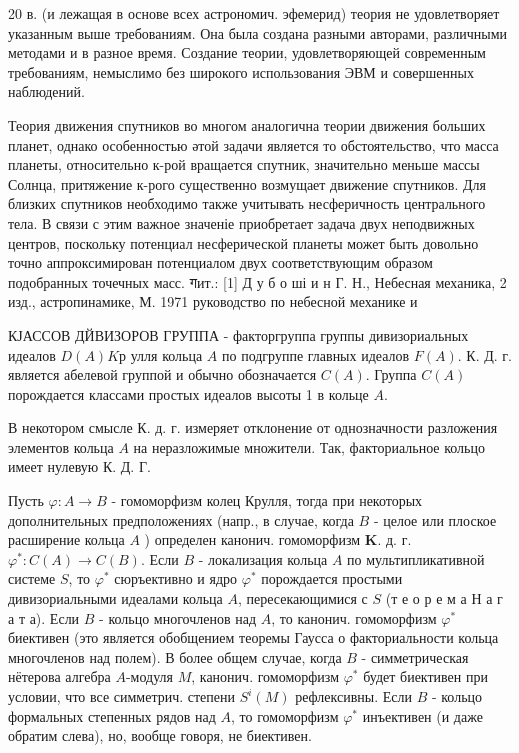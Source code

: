 \documentclass[10pt]{article}
\begin{document}
20 в. (и лежащая в основе всех астрономич. эфемерид) теория не удовлетворяет указанным выше требованиям. Она была создана разными авторами, различными методами и в разное время. Создание теории, удовлетворяющей современным требованиям, немыслимо без широкого использования ЭВМ и совершенных наблюдений.



Теория движения спутников во многом аналогична теории движения больших планет, однако особенностью әтой задачи является то обстоятельство, что масса планеты, относительно к-рой вращается спутник, значительно меньше массы Солнца, притяжение к-рого существенно возмущает движение спутников. Для близких спутников необходимо также учитывать несферичность центрального тела. В связи с этим важное значеніе приобретает задача двух неподвижных центров, поскольку потенциал несферической планеты может быть довольно точно аппроксимирован потенциалом двух соответствующим образом подобранных точечных масс. गит.: [1] Д у б о ші и н Г. Н., Небесная механика, 2 изд., астропинамике, М. 1971 руководство по небесной механике и



КЈАССОВ ДЙВИЗОРОВ ГРУППА - факторгруппа группы дивизориальных идеалов $D(A) K р$ улля кольца $A$ по подгруппе главных идеалов $F(A)$. К. Д. г. является абелевой группой и обычно обозначается $C(A)$. Группа $C(A)$ порождается классами простых идеалов высоты 1 в кольце $A$.



В некотором смысле К. д. г. измеряет отклонение от однозначности разложения элементов кольца $A$ на неразложимые множители. Так, факториальное кольцо имеет нулевую $К$. Д. Г.



Пусть $\varphi: A \rightarrow B$ - гомоморфизм колец Крулля, тогда при некоторых дополнительных предположениях (напр., в случае, когда $B$ - целое или плоское расширение кольца $A$ ) определен канонич. гомоморфизм $\boldsymbol{K}$. д. г. $\varphi^{*}: C(A) \rightarrow C(B)$. Если $B$ - локализация кольца $A$ по мультипликативной системе $S$, то $\varphi^{*}$ сюръективно и ядро $\varphi^{*}$ порождается простыми дивизориальными идеалами кольца $A$, пересекающимися с $S$ (т е о р е м а Н а г а т а). Если $B$ - кольцо многочленов над $A$, то канонич. гомоморфизм $\varphi^{*}$ биективен (это является обобщением теоремы Гаусса о факториальности кольца многочленов над полем). В более общем случае, когда $B$ - симметрическая нётерова алгебра $A$-модуля $M$, канонич. гомоморфизм $\varphi^{*}$ будет биективен при условии, что все симметрич. степени $S^{i}(M)$ рефлексивны. Если $B$ - кольцо формальных степенных рядов над $A$, то гомоморфизм $\varphi^{*}$ инъективен (и даже обратим слева), но, вообще говоря, не биективен.
\end{document}
